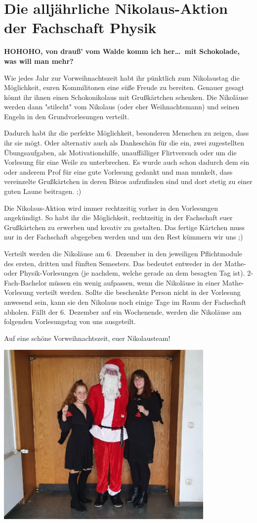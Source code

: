 \section{Die alljährliche Nikolaus-Aktion der Fachschaft Physik}
\begin{multicols}{2}
\textbf{HOHOHO, von drauß' vom Walde komm ich her\dots\
	mit Schokolade, was will man mehr?}

Wie jedes Jahr zur Vorweihnachtszeit habt ihr pünktlich zum Nikolaustag die Möglichkeit, euren Kommilitonen eine süße Freude zu bereiten. Genauer gesagt könnt ihr ihnen einen Schokonikolaus mit Grußkärtchen schenken. 
Die Nikoläuse werden dann "stilecht" vom Nikolaus (oder eher Weihnachtsmann) und seinen Engeln in den Grundvorlesungen verteilt.

Dadurch habt ihr die perfekte Möglichkeit, besonderen Menschen zu zeigen, dass ihr sie mögt. Oder alternativ auch als Dankeschön für die ein, zwei zugestellten Übungsaufgaben, als Motivationshilfe, unauffälliger Flirtversuch oder um die Vorlesung für eine Weile zu unterbrechen. Es wurde auch schon dadurch dem ein oder anderem Prof für eine gute Vorlesung gedankt und man munkelt, dass vereinzelte Grußkärtchen in deren Büros aufzufinden sind und dort stetig zu einer guten Laune beitragen. ;)

Die Nikolaus-Aktion wird immer rechtzeitig vorher in den Vorlesungen angekündigt. So habt ihr die Möglichkeit, rechtzeitig in der Fachschaft euer Grußkärtchen zu erwerben und kreativ zu gestalten. 
Das fertige Kärtchen muss nur in der Fachschaft abgegeben werden und um den Rest kümmern wir uns ;)

Verteilt werden die Nikoläuse am 6.~Dezember in den jeweiligen Pflichtmodule des ersten, dritten und fünften Semesters. Das bedeutet entweder in der Mathe- oder Physik-Vorlesungen (je nachdem, welche gerade an dem besagten Tag ist).
2-Fach-Bachelor müssen ein wenig aufpassen, wenn die Nikoläuse in einer Mathe-Vorlesung verteilt werden.
Sollte die beschenkte Person nicht in der Vorlesung anwesend sein, kann sie den Nikolaus noch einige Tage im Raum der Fachschaft abholen.
Fällt der 6.~Dezember auf ein Wochenende, werden die Nikoläuse am folgenden Vorlesungstag von uns ausgeteilt.

Auf eine schöne Vorweihnachtszeit, euer Nikolausteam!

\end{multicols}

\vspace{\fill}
\begin{center}
	\includegraphics[width=0.8\textwidth]{res/Nikoklaus_cut.jpg}
\end{center}
